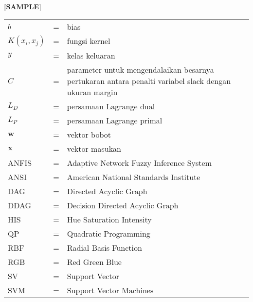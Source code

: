 \begin{center}
	\textbf{[SAMPLE]}
\end{center}

\begin{tabular}{llp{3in}}
	$b$	& \hspace{1.5cm} = &	bias \\
	$K(x_i,x_j)$ & \hspace{1.5cm} = & fungsi kernel \\ 
	$y$	& \hspace{1.5cm} = & kelas keluaran \\
	$C$	&  \hspace{1.5cm} = & parameter untuk mengendalaikan besarnya pertukaran antara penalti variabel slack dengan ukuran margin \\
	$L_D$	& \hspace{1.5cm} = & persamaan Lagrange dual \\
	$L_P$	& \hspace{1.5cm}  = &	persamaan Lagrange primal \\
	$\textbf{w}$ &  \hspace{1.5cm} = &	vektor bobot \\
	$\textbf{x}$ &  \hspace{1.5cm} = &	vektor masukan\\
		ANFIS &  \hspace{1.5cm} = &	Adaptive Network Fuzzy Inference System\\
		ANSI	&  \hspace{1.5cm} = &	American National Standards Institute\\
		DAG	&  \hspace{1.5cm} = & Directed Acyclic Graph\\
		DDAG &  \hspace{1.5cm} = & Decision Directed Acyclic Graph\\
		HIS	&  \hspace{1.5cm} = & Hue Saturation Intensity\\
		QP	&  \hspace{1.5cm} = & Quadratic Programming\\
		RBF	&  \hspace{1.5cm} = &	Radial Basis Function\\
		RGB	&  \hspace{1.5cm} = & Red Green Blue\\
		SV	&  \hspace{1.5cm} = &	Support Vector\\
		SVM	&  \hspace{1.5cm} = & Support Vector Machines\\
		
\end{tabular}
